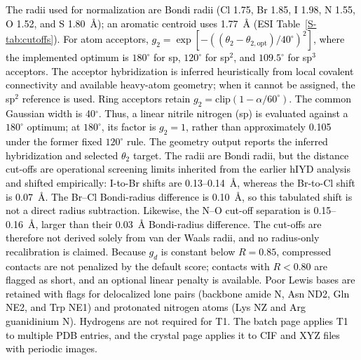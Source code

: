 \documentclass[journal=jcisd8,manuscript=article,layout=two-column]{achemso}
\newcommand{\tcb}[1]{{\textcolor{black}{#1}}}
\begin{document}
\tcb{The radii used for normalization are Bondi radii (Cl 1.75, Br 1.85, I 1.98, N 1.55, O 1.52, and S 1.80~\AA{}); an aromatic centroid uses 1.77~\AA{} (ESI Table~\ref{S-tab:cutoffs}). For atom acceptors, $g_2=\exp[-((\theta_2-\theta_{2,\mathrm{opt}})/40^\circ)^2]$, where the implemented optimum is $180^\circ$ for sp, $120^\circ$ for sp$^2$, and $109.5^\circ$ for sp$^3$ acceptors. The acceptor hybridization is inferred heuristically from local covalent connectivity and available heavy-atom geometry; when it cannot be assigned, the sp$^2$ reference is used. Ring acceptors retain $g_2=\mathrm{clip}(1-\alpha/60^\circ)$. The common Gaussian width is 40$^\circ$. Thus, a linear nitrile nitrogen (sp) is evaluated against a $180^\circ$ optimum; at $180^\circ$, its factor is $g_2=1$, rather than approximately 0.105 under the former fixed $120^\circ$ rule. The geometry output reports the inferred hybridization and selected $\theta_2$ target. The radii are Bondi radii, but the distance cut-offs are operational screening limits inherited from the earlier hIYD analysis and shifted empirically: I-to-Br shifts are 0.13--0.14~\AA{}, whereas the Br-to-Cl shift is 0.07~\AA{}. The Br--Cl Bondi-radius difference is 0.10~\AA{}, so this tabulated shift is not a direct radius subtraction. Likewise, the N--O cut-off separation is 0.15--0.16~\AA{}, larger than their 0.03~\AA{} Bondi-radius difference. The cut-offs are therefore not derived solely from van der Waals radii, and no radius-only recalibration is claimed. Because $g_d$ is constant below $R=0.85$, compressed contacts are not penalized by the default score; contacts with $R<0.80$ are flagged as short, and an optional linear penalty is available. Poor Lewis bases are retained with flags for delocalized lone pairs (backbone amide N, Asn ND2, Gln NE2, and Trp NE1) and protonated nitrogen atoms (Lys NZ and Arg guanidinium N). Hydrogens are not required for T1. The batch page applies T1 to multiple PDB entries, and the crystal page applies it to CIF and XYZ files with periodic images.}
\end{document}
